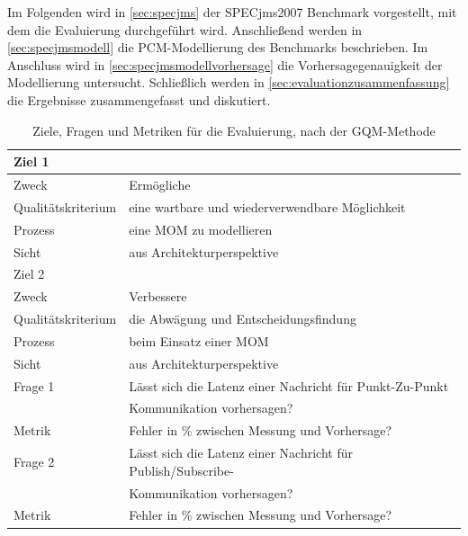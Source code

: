 Im Folgenden wird in \autoref{sec:specjms} der SPECjms2007 Benchmark vorgestellt, mit dem die Evaluierung durchgeführt wird. Anschließend werden in \autoref{sec:specjmsmodell} die PCM-Modellierung des Benchmarks beschrieben. Im Anschluss wird in \autoref{sec:specjmsmodellvorhersage} die Vorhersagegenauigkeit der Modellierung untersucht. Schließlich werden in \autoref{sec:evaluationzusammenfassung} die Ergebnisse zusammengefasst und diskutiert. 
\begin{table}
  \begin{tabular}{|l|l|}
    \hline
    \multicolumn{2}{|l|}{Ziel 1} \\
    \hline
    Zweck & Ermögliche \\
    Qualitätskriterium & eine wartbare und wiederverwendbare Möglichkeit  \\ 
    Prozess & eine MOM zu modellieren \\
    Sicht & aus Architekturperspektive \\
   
    \hline \hline
    \multicolumn{2}{|l|}{Ziel 2} \\
    \hline
    Zweck & Verbessere \\
    Qualitätskriterium & die Abwägung und Entscheidungsfindung  \\ 
    Prozess & beim Einsatz einer MOM \\
    Sicht & aus Architekturperspektive \\
    \hline \hline
    Frage 1 & Lässt sich die Latenz einer Nachricht für Punkt-Zu-Punkt \\
    & Kommunikation vorhersagen? \\
    \hline
    Metrik & Fehler in \% zwischen Messung und Vorhersage? \\
    \hline \hline
    Frage 2 & Lässt sich die Latenz einer Nachricht für Publish/Subscribe-\\
    & Kommunikation vorhersagen? \\
    \hline
    Metrik & Fehler in \% zwischen Messung und Vorhersage? \\
    \hline
  \end{tabular}
	\caption{\label{tab:gqm} Ziele, Fragen und Metriken für die Evaluierung, nach der GQM-Methode}
\end{table}



